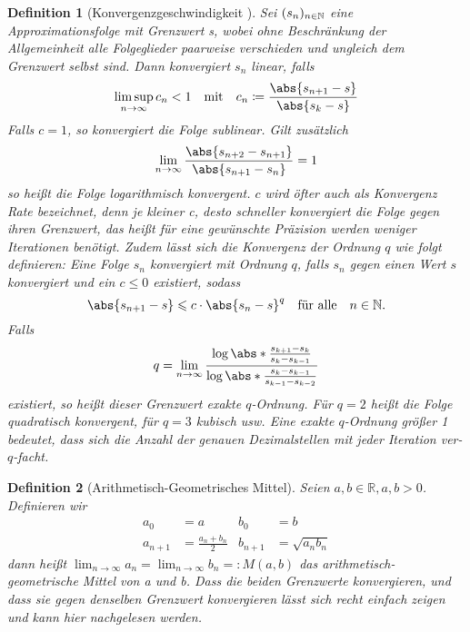 \documentclass{scrartcl}
\newtheorem{definition}{Definition}
\theoremstyle{definition}
\newtheorem{approximation sequence}{Annäherungsfolge}
\DeclarePairedDelimiter{\paren}{\lparen}{\rparen}
\newcommand{\field}[1]{\mathbb{#1}}
\newcommand{\nats}{\field{N}}
\newcommand{\reals}{\field{R}}
\begin{document}
\begin{definition}[Konvergenzgeschwindigkeit \cite{Konvergenzgeschwindigkeit}]\label{def:convergence-rate}
    Sei \(\paren{s_n}_{n \in \nats}\) eine Approximationsfolge mit Grenzwert s,
    wobei ohne Beschränkung der Allgemeinheit alle Folgeglieder paarweise
    verschieden und ungleich dem Grenzwert selbst sind. Dann konvergiert \(s_n\)
    linear, falls
    \begin{equation*}
        \limsup_{n \to \infty} c_n < 1 \quad \text{mit} \quad c_n
        \coloneq \frac{\abs{s_{n+1} - s}}{\abs{s_k - s}}
    \end{equation*}
    Falls \(c = 1\), so konvergiert die Folge sublinear. Gilt zusätzlich
    \begin{equation*}
        \lim_{n \to \infty} \frac{\abs{s_{n+2} - s_{n+1}}}{\abs{s_{n+1} - s_n}}
        = 1
    \end{equation*}
    so heißt die Folge logarithmisch konvergent. \(c\) wird öfter auch als
    Konvergenz Rate bezeichnet, denn je kleiner c, desto schneller konvergiert
    die Folge gegen ihren Grenzwert, das heißt für eine gewünschte Präzision
    werden weniger Iterationen benötigt. Zudem lässt sich die Konvergenz der
    Ordnung \(q\) wie folgt definieren: Eine Folge \(s_n\) konvergiert mit
    Ordnung \(q\), falls \(s_n\) gegen einen Wert \(s\) konvergiert und ein
    \(c \le 0\) existiert, sodass
    \begin{equation*}
        \abs{s_{n+1} - s} \leqslant c \cdot \abs{s_n - s}^q \quad
        \text{für alle} \quad n \in \nats.
    \end{equation*}
    Falls
    \begin{equation*}
        q = \lim_{n \to \infty} \frac{%
            \log\abs*{\frac{s_{k+1} - s_k}{s_k - s_{k-1}}}
        }{%
            \log\abs*{\frac{s_k - s_{k-1}}{s_{k-1} - s_{k-2}}}
        }
    \end{equation*}
    existiert, so heißt dieser Grenzwert exakte \(q\)-Ordnung. Für \(q = 2\)
    heißt die Folge quadratisch konvergent, für \(q = 3 \) kubisch usw.
    Eine exakte \(q\)-Ordnung größer 1 bedeutet, dass sich die Anzahl der genauen
    Dezimalstellen mit jeder Iteration ver-\(q\)-facht.
\end{definition}

\begin{definition}[Arithmetisch-Geometrisches Mittel]
    Seien \(a, b \in \reals, a,b > 0\). Definieren wir
    \begin{align*}
        a_0     & = a                   & b_0     & = b              \\
        a_{n+1} & = \frac{a_n + b_n}{2} & b_{n+1} & = \sqrt{a_n b_n}
    \end{align*}
    dann heißt \(\lim_{n \to \infty} a_n = \lim_{n \to \infty} b_n =: M(a,b)\)
    das arithmetisch-geometrische Mittel von a und b. Dass die beiden
    Grenzwerte konvergieren, und dass sie gegen denselben Grenzwert
    konvergieren lässt sich recht einfach zeigen und kann hier \cite{AGM}
    nachgelesen werden.
\end{definition}
\end{document}
